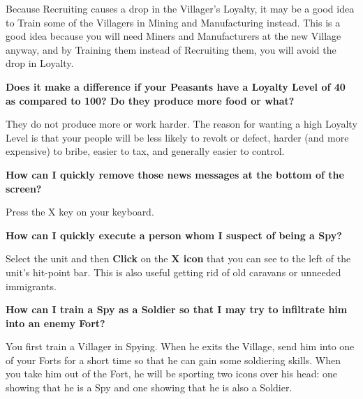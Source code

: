 Because Recruiting causes a drop in the Villager’s Loyalty, it may be a good idea to Train some of the Villagers in Mining and Manufacturing instead. This is a good idea because you will need Miners and Manufacturers at the new Village anyway, and by Training them instead of Recruiting them, you will avoid the drop in Loyalty.

{\large \textbf{\textsf{Does it make a difference if your Peasants have a Loyalty Level of 40 as compared to 100? Do they produce more food or what?}}}

They do not produce more or work harder. The reason for wanting a high Loyalty Level is that your people will be less likely to revolt or defect, harder (and more expensive) to bribe, easier to tax, and generally easier to control.

{\large \textbf{\textsf{How can I quickly remove those news messages at the bottom of the screen?}}}

Press the X key on your keyboard.

{\large \textbf{\textsf{How can I quickly execute a person whom I suspect of being a Spy?}}}

Select the unit and then \textbf{Click} on the \textbf{X icon} that you can see to the left of the unit’s hit-point bar. This is also useful getting rid of old caravans or unneeded immigrants.

{\large \textbf{\textsf{How can I train a Spy as a Soldier so that I may try to infiltrate him into an enemy Fort?}}}

You first train a Villager in Spying. When he exits the Village, send him into one of your Forts for a short time so that he can gain some soldiering skills. When you take him out of the Fort, he will be sporting two icons over his head: one showing that he is a Spy and one showing that he is also a Soldier.
